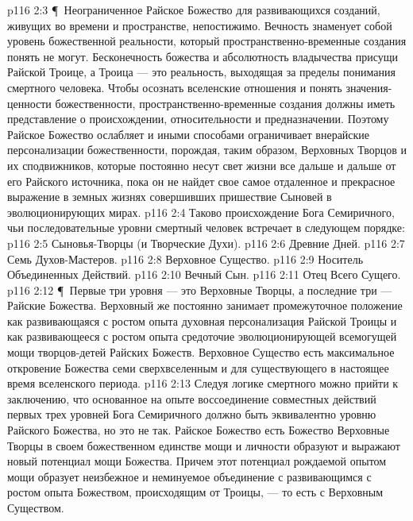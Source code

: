 \vs p116 2:3 \P\ Неограниченное Райское Божество для развивающихся созданий, живущих во времени и пространстве, непостижимо. Вечность знаменует собой уровень божественной реальности, который пространственно\hyp{}временные создания понять не могут. Бесконечность божества и абсолютность владычества присущи Райской Троице, а Троица --- это реальность, выходящая за пределы понимания смертного человека. Чтобы осознать вселенские отношения и понять значения\hyp{}ценности божественности, пространственно\hyp{}временные создания должны иметь представление о происхождении, относительности и предназначении. Поэтому Райское Божество ослабляет и иными способами ограничивает внерайские персонализации божественности, порождая, таким образом, Верховных Творцов и их сподвижников, которые постоянно несут свет жизни все дальше и дальше от его Райского источника, пока он не найдет свое самое отдаленное и прекрасное выражение в земных жизнях совершивших пришествие Сыновей в эволюционирующих мирах.
\vs p116 2:4 Таково происхождение Бога Семиричного, чьи последовательные уровни смертный человек встречает в следующем порядке:
\vs p116 2:5 \bibnobreakspace Сыновья\hyp{}Творцы (и Творческие Духи).
\vs p116 2:6 \bibnobreakspace Древние Дней.
\vs p116 2:7 \bibnobreakspace Семь Духов\hyp{}Мастеров.
\vs p116 2:8 \bibnobreakspace Верховное Существо.
\vs p116 2:9 \bibnobreakspace Носитель Объединенных Действий.
\vs p116 2:10 \bibnobreakspace Вечный Сын.
\vs p116 2:11 \bibnobreakspace Отец Всего Сущего.
\vs p116 2:12 \P\ Первые три уровня --- это Верховные Творцы, а последние три --- Райские Божества. Верховный же постоянно занимает промежуточное положение как развивающаяся с ростом опыта духовная персонализация Райской Троицы и как развивающееся с ростом опыта средоточие эволюционирующей всемогущей мощи творцов\hyp{}детей Райских Божеств. Верховное Существо есть максимальное откровение Божества семи сверхвселенным и для существующего в настоящее время вселенского периода.
\vs p116 2:13 Следуя логике смертного можно прийти к заключению, что основанное на опыте воссоединение совместных действий первых трех уровней Бога Семиричного должно быть эквивалентно уровню Райского Божества, но это не так. Райское Божество есть Божество  Верховные Творцы в своем божественном единстве мощи и личности образуют и выражают новый потенциал мощи  Божества. Причем этот потенциал рождаемой опытом мощи образует неизбежное и неминуемое объединение с развивающимся с ростом опыта Божеством, происходящим от Троицы, --- то есть с Верховным Существом.

